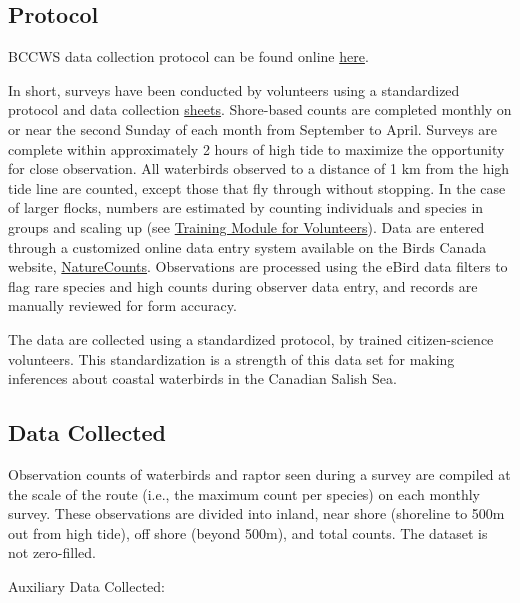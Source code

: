 \documentclass[
  letterpaper,
  DIV=11,
  numbers=noendperiod]{scrreprt}
\begin{document}
\subsection{Protocol}\label{protocol}

BCCWS data collection protocol can be found online
\href{https://www.birdscanada.org/bird-science/british-columbia-coastal-waterbird-survey/bccws_resources}{here}.

In short, surveys have been conducted by volunteers using a standardized
protocol and data collection
\href{https://birdscanada.b-cdn.net/wp-content/uploads/2021/02/BCCWS_Datasheet.pdf}{sheets}.
Shore-based counts are completed monthly on or near the second Sunday of
each month from September to April. Surveys are complete within
approximately 2 hours of high tide to maximize the opportunity for close
observation. All waterbirds observed to a distance of 1 km from the high
tide line are counted, except those that fly through without stopping.
In the case of larger flocks, numbers are estimated by counting
individuals and species in groups and scaling up (see
\href{https://birdscanada.b-cdn.net/wp-content/uploads/2020/02/BCCWS-Training-Module.pdf}{Training
Module for Volunteers}). Data are entered through a customized online
data entry system available on the Birds Canada website,
\href{https://birdscanada.github.io/www.birdscanada.\%20org/birdmon/default/main.jsp}{NatureCounts}.
Observations are processed using the eBird data filters to flag rare
species and high counts during observer data entry, and records are
manually reviewed for form accuracy.

The data are collected using a standardized protocol, by trained
citizen-science volunteers. This standardization is a strength of this
data set for making inferences about coastal waterbirds in the Canadian
Salish Sea.

\subsection{Data Collected}\label{data-collected}

Observation counts of waterbirds and raptor seen during a survey are
compiled at the scale of the route (i.e., the maximum count per species)
on each monthly survey. These observations are divided into inland, near
shore (shoreline to 500m out from high tide), off shore (beyond 500m),
and total counts. The dataset is not zero-filled.

Auxiliary Data Collected:
\end{document}
